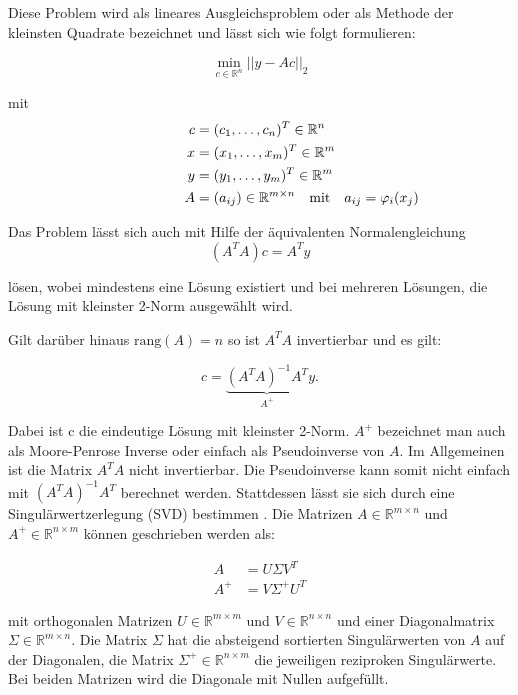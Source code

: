 Diese Problem wird als lineares Ausgleichsproblem oder als Methode der kleinsten Quadrate bezeichnet und lässt sich wie folgt formulieren:

\[
\min_{c\in\mathbb{R}^n} ||y - Ac||_2
\]

mit
\[
\begin{aligned}
c &= (c_1,\dotsc,c_n)^T\in\mathbb{R}^n \\
x &= (x_1,\dotsc,x_m)^T\in\mathbb{R}^m \\
y &= (y_1,\dotsc,y_m)^T\in\mathbb{R}^m \\
A &= (a_{ij})\in\mathbb{R}^{m\times n} \rlap{\quad\text{mit}\quad $a_{ij} = \varphi_i(x_j)$}
\end{aligned}
\]

Das Problem lässt sich auch mit Hilfe der äquivalenten Normalengleichung
\[
	(A^TA)c = A^Ty
\]

lösen, wobei mindestens eine Lösung existiert und bei mehreren Lösungen, die Lösung mit kleinster 2-Norm ausgewählt wird.

Gilt darüber hinaus $\text{rang}\left(A\right) = n$ so ist $A^TA$ invertierbar und es gilt:

\begin{equation}\label{eq:normaleq}
c = \underbrace{(A^TA)^{-1}A^T}_{A^+}y.
\end{equation}

Dabei ist c die eindeutige Lösung mit kleinster 2-Norm. $A^+$ bezeichnet man auch als Moore-Penrose Inverse oder einfach als Pseudoinverse von $A$. Im Allgemeinen ist die Matrix $A^TA$ nicht invertierbar. Die Pseudoinverse kann somit nicht einfach mit $(A^TA)^{-1}A^T$ berechnet werden. Stattdessen lässt sie sich durch eine Singulärwertzerlegung (SVD) bestimmen \cite{Stoer2011}. Die Matrizen $A\in\mathbb{R}^{m\times n}$ und $A^+\in\mathbb{R}^{n\times m}$ können geschrieben werden als:

\[
\begin{aligned}
A &= U\Sigma V^T \\
A^+ &= V\Sigma^+U^T
\end{aligned}
\]

mit orthogonalen Matrizen $U\in\mathbb{R}^{m\times m}$ und $V\in\mathbb{R}^{n\times n}$ und einer Diagonalmatrix $\Sigma\in\mathbb{R}^{m\times n}$. 
Die Matrix $\Sigma$ hat die absteigend sortierten Singulärwerten von $A$ auf der Diagonalen, die Matrix $\Sigma^+\in\mathbb{R}^{n\times m}$ die jeweiligen reziproken Singulärwerte. Bei beiden Matrizen wird die Diagonale mit Nullen aufgefüllt. 


